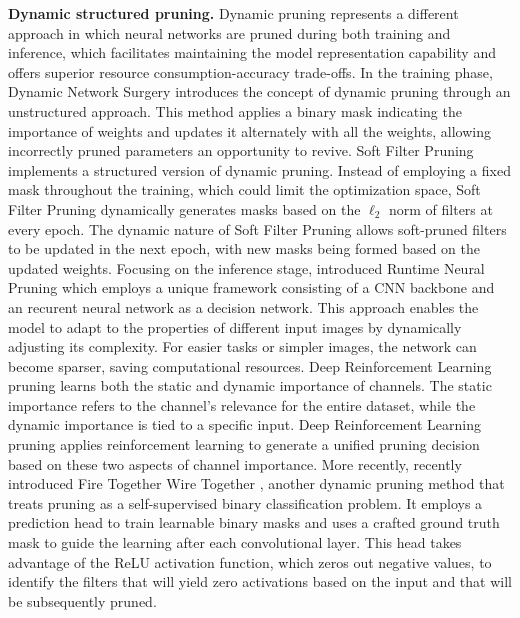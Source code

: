 \noindent\textbf{Dynamic structured pruning.} Dynamic pruning represents a
different approach in which neural networks are pruned during both training and
inference, which facilitates maintaining the model representation capability and
offers superior resource consumption-accuracy trade-offs. In the training phase,
Dynamic Network Surgery \cite{DBLP:conf/nips/GuoYC16} introduces the concept of
dynamic pruning through an unstructured approach. This method applies a binary
mask indicating the importance of weights and updates it alternately with all
the weights, allowing incorrectly pruned parameters an opportunity to revive.
Soft Filter Pruning \cite{DBLP:conf/ijcai/HeKDFY18} implements a structured
version of dynamic pruning. Instead of employing a fixed mask throughout the
training, which could limit the optimization space, Soft Filter Pruning
dynamically generates masks based on the $\ell_2$ norm of filters at every
epoch. The dynamic nature of Soft Filter Pruning allows soft-pruned filters to
be updated in the next epoch, with new masks being formed based on the updated
weights. Focusing on the inference stage, \citeauthor{DBLP:conf/nips/LinRLZ17}
introduced Runtime Neural Pruning \cite{DBLP:conf/nips/LinRLZ17} which employs a
unique framework consisting of a \ac{CNN} backbone and an recurent neural
network as a decision network. This approach enables the model to adapt to the
properties of different input images by dynamically adjusting its complexity.
For easier tasks or simpler images, the network can become sparser, saving
computational resources. Deep Reinforcement Learning pruning
\cite{DBLP:conf/nips/ChenCP20} learns both the static and dynamic importance of
channels. The static importance refers to the channel's relevance for the entire
dataset, while the dynamic importance is tied to a specific input. Deep
Reinforcement Learning pruning \cite{DBLP:conf/nips/ChenCP20} applies
reinforcement learning to generate a unified pruning decision based on these two
aspects of channel importance. More recently,
\citeauthor{DBLP:conf/cvpr/ElkerdawyE0R22} recently introduced Fire Together
Wire Together \cite{DBLP:conf/cvpr/ElkerdawyE0R22}, another dynamic pruning
method that treats pruning as a self-supervised binary classification problem.
It employs a prediction head to train learnable binary masks and uses a crafted
ground truth mask to guide the learning after each convolutional layer. This
head takes advantage of the \ac{ReLU} activation function, which zeros out
negative values, to identify the filters that will yield zero activations based
on the input and that will be subsequently pruned.\\

